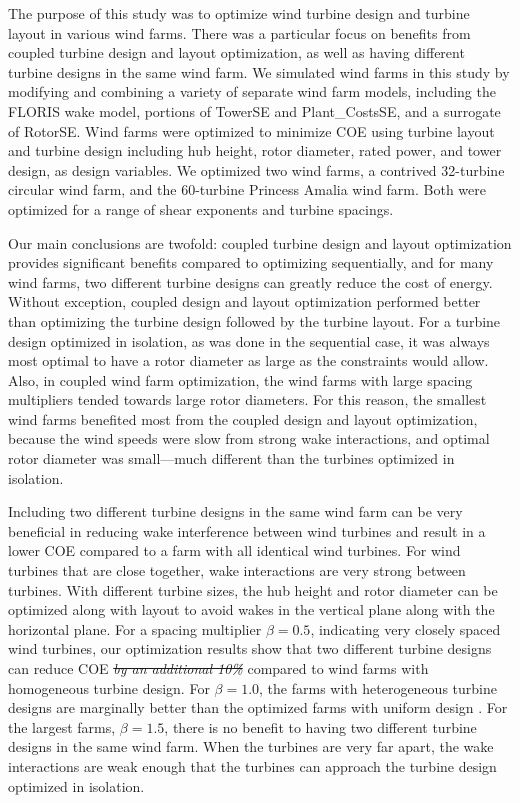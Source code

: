 \documentclass[wes, manuscript]{copernicus}
\providecommand{\DIFadd}[1]{{\protect\color{blue}\uwave{#1}}} %
\providecommand{\DIFdel}[1]{{\protect\color{red}\sout{#1}}}                      %
\providecommand{\DIFaddbegin}{} %
\providecommand{\DIFaddend}{} %
\providecommand{\DIFdelbegin}{} %
\providecommand{\DIFdelend}{} %
\begin{document}
\DIFdelend \conclusions  %
The purpose of this study was to optimize wind turbine design and turbine layout in various wind farms. There was a particular focus on benefits from coupled turbine design and layout optimization, as well as having different turbine designs in the same wind farm. We simulated wind farms in this study by modifying and combining a variety of separate wind farm models, including the FLORIS wake model, portions of TowerSE and Plant\_CostsSE, and a surrogate of RotorSE. Wind farms were optimized to minimize COE using turbine layout and turbine design including hub height, rotor diameter, rated power, and tower design, as design variables. We optimized two wind farms, a contrived 32-turbine circular wind farm, and the 60-turbine Princess Amalia wind farm. Both were optimized for a range of shear exponents and turbine spacings. 

Our main conclusions are twofold: coupled turbine design and layout optimization provides significant benefits compared to optimizing sequentially, and for many wind farms, two different turbine designs can greatly reduce the cost of energy. Without exception, coupled design and layout optimization performed better than optimizing the turbine design followed by the turbine layout. For a turbine design optimized in isolation, as was done in the sequential case, it was always most optimal to have a rotor diameter as large as the constraints would allow. Also, in coupled wind farm optimization, the wind farms with large spacing multipliers tended towards large rotor diameters. For this reason, the smallest wind farms benefited most from the coupled design and layout optimization, because the wind speeds were slow from strong wake interactions, and optimal rotor diameter was small---much different than the turbines optimized in isolation.

Including two different turbine designs in the same wind farm can be very beneficial in reducing wake interference between wind turbines and result in a lower COE compared to a farm with all identical wind turbines. For wind turbines that are close together, wake interactions are very strong between turbines. With different turbine sizes, the hub height and rotor diameter can be optimized along with layout to avoid wakes in the vertical plane along with the horizontal plane. For a spacing multiplier $\beta=0.5$, indicating very closely spaced wind turbines, our optimization results show that two different turbine designs can reduce COE \DIFdelbegin \textit{\DIFdel{by an additional 10\%}} %
\DIFdelend \DIFaddbegin \DIFadd{by an additional 10\% }\DIFaddend compared to wind farms with homogeneous turbine design. For $\beta=1.0$, the farms with heterogeneous turbine designs are marginally better than the optimized farms with uniform design \DIFaddbegin \DIFadd{by 1--3\%}\DIFaddend . For the largest farms, $\beta=1.5$, there is no benefit to having two different turbine designs in the same wind farm. When the turbines are very far apart, the wake interactions are weak enough that the turbines can approach the turbine design optimized in isolation. 
\end{document}

